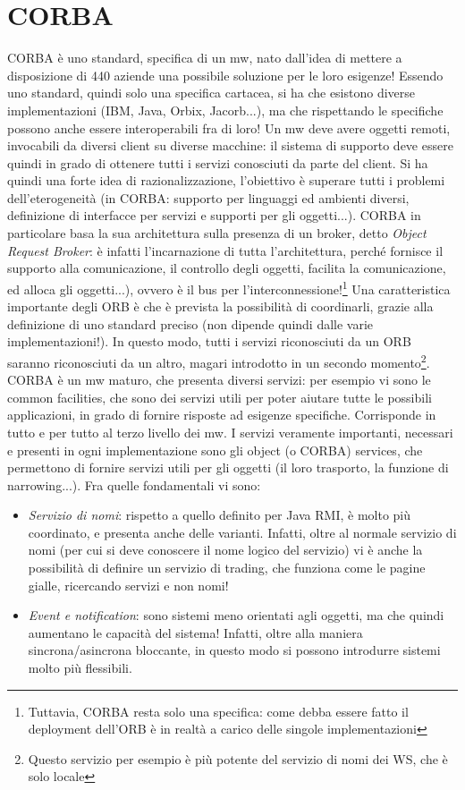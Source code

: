 \section{CORBA}
CORBA è uno standard, specifica di un mw, nato dall'idea di mettere a disposizione di 440 aziende una possibile
soluzione per le loro esigenze!
Essendo uno standard, quindi solo una specifica cartacea, si ha che esistono diverse implementazioni (IBM, Java, Orbix,
Jacorb...), ma che rispettando le specifiche possono anche essere interoperabili fra di loro!
Un mw deve avere oggetti remoti, invocabili da diversi client su diverse macchine: il sistema di supporto deve essere
quindi in grado di ottenere tutti i servizi conosciuti da parte del client. Si ha quindi una forte idea di
razionalizzazione, l'obiettivo è superare tutti i problemi dell'eterogeneità (in CORBA: supporto per linguaggi ed
ambienti diversi, definizione di interfacce per servizi e supporti per gli oggetti...).
CORBA in particolare basa la sua architettura sulla presenza di un broker, detto \textit{Object Request Broker}: è
infatti l'incarnazione di tutta l'architettura, perché fornisce il supporto alla comunicazione, il controllo degli
oggetti, facilita la comunicazione, ed alloca gli oggetti...), ovvero è il bus per
l'interconnessione!\footnote{Tuttavia, CORBA resta solo una specifica: come debba essere fatto il deployment
dell'ORB è in realtà a carico delle singole implementazioni} Una caratteristica importante degli ORB è che è prevista la
possibilità di coordinarli, grazie alla definizione di uno standard preciso (non dipende quindi dalle varie
implementazioni!). In questo modo, tutti i servizi riconosciuti da un ORB saranno riconosciuti da un altro, magari
introdotto in un secondo momento\footnote{Questo servizio per esempio è più potente del servizio di nomi dei WS, che è
solo locale}.
CORBA è un mw maturo, che presenta diversi servizi: per esempio vi sono le common facilities, che sono dei servizi utili
per poter aiutare tutte le possibili applicazioni, in grado di fornire risposte ad esigenze specifiche. Corrisponde in
tutto e per tutto al terzo livello dei mw.
I servizi veramente importanti, necessari e presenti in ogni implementazione sono gli object (o CORBA) services, che
permettono di fornire servizi utili per gli oggetti (il loro trasporto, la funzione di narrowing...).
Fra quelle fondamentali vi sono:
\begin{itemize}
 \item \textit{Servizio di nomi}: rispetto a quello definito per Java RMI, è molto più coordinato, e presenta anche
 delle varianti. Infatti, oltre al normale servizio di nomi (per cui si deve conoscere il nome logico del servizio) vi
 è  anche la possibilità di definire un servizio di trading, che funziona come le pagine gialle, ricercando servizi e
 non nomi!
 \item \textit{Event e notification}: sono sistemi meno orientati agli oggetti, ma che quindi aumentano le capacità del
 sistema! Infatti, oltre alla maniera sincrona/asincrona bloccante, in questo modo si possono introdurre sistemi
 molto più flessibili.
\end{itemize}
